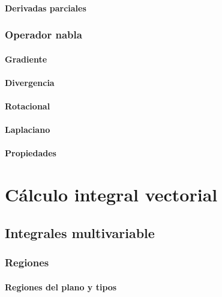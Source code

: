 \documentclass[12pt, fleqn]{report}                             %
\begin{document}
            \subsection{Derivadas parciales}
        
        \section{Operador nabla}
        
            \subsection{Gradiente}
            
            \subsection{Divergencia}
            
            \subsection{Rotacional}
            
            \subsection{Laplaciano}
            
            \subsection{Propiedades}



\part{Cálculo integral vectorial}

    \chapter{Integrales multivariable}
    
        \section{Regiones}
        
            \subsection{Regiones del plano y tipos}
            
\end{document}
